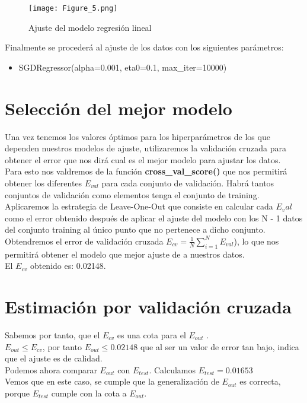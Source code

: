 \begin{figure}[H]
   \centering
   \texttt{[image: Figure\_5.png]}
   \caption{Ajuste del modelo regresión lineal}
\end{figure}


Finalmente se procederá al ajuste de los datos con los siguientes parámetros:
\begin{itemize}
   \item SGDRegressor(alpha=0.001, eta0=0.1, max\_iter=10000)
\end{itemize}

\newpage

\section{Selección del mejor modelo}
Una vez tenemos los valores óptimos para los hiperparámetros de los que dependen nuestros modelos de ajuste, utilizaremos la validación cruzada para obtener el error que nos dirá cual es el mejor modelo para ajustar los datos.\\
Para esto nos valdremos de la función \textbf{cross\_val\_score()} \cite{Score} que nos permitirá obtener los diferentes $E_{val}$ para cada conjunto de validación. Habrá tantos conjuntos de validación como elementos tenga el conjunto de training. Aplicaremos la estrategia de Leave-One-Out que consiste en calcular cada $E_val$ como el error obtenido después de aplicar el ajuste del modelo con los N - 1 datos del conjunto training al único punto que no pertenece a dicho conjunto. Obtendremos el error de validación cruzada $E_{cv} = \frac{1}{N}\sum_{i=1}^{N}E_{val}$), lo que nos permitirá obtener el modelo que mejor ajuste de a nuestros datos.\\
El $E_{cv}$ obtenido es: 0.02148.

\section{Estimación por validación cruzada}
Sabemos por tanto, que el $E_{cv}$ es una cota para el $E_{out}$ \cite{Cota}.\\
$E_{out} \leq E_{cv}$, por tanto $E_{out} \leq 0.02148$ que al ser un valor de error tan bajo, indica que el ajuste es de calidad.\\
Podemos ahora comparar $E_{out}$ con $E_{test}$. Calculamos $E_{test} = 0.01653$
\\
Vemos que en este caso, se cumple que la generalización de $E_{out}$ es correcta, porque $E_{test}$ cumple con la cota a $E_{out}$.

